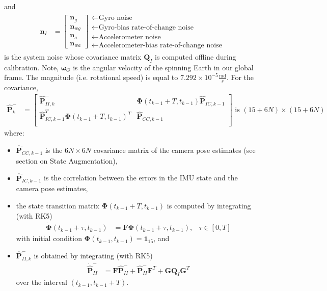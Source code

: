\documentclass[10pt,letterpaper,fleqn,oneside]{article}
\newcommand{\nl}{\\[0.5em]}
\def\Vec#1{\mathbf{#1}} %
\newcommand{\bbm}{\begin{bmatrix}}
\newcommand{\ebm}{\end{bmatrix}}
\begin{document}
and
\begin{align}
\Vec{n}_I &= \bbm \Vec{n}_g \nl \Vec{n}_{wg} \nl \Vec{n}_a \nl \Vec{n}_{wa} \ebm
					\begin{array}{l}
					\leftarrow \text{Gyro noise} \nl
					\leftarrow \text{Gyro-bias rate-of-change noise} \nl
					\leftarrow \text{Accelerometer noise} \nl
					\leftarrow \text{Accelerometer-bias rate-of-change noise}
					\end{array}		
\end{align}
is the system noise whose covariance matrix $\Vec{Q}_I$ is computed offline during calibration. Note, $\pmb{\omega}_G$ is the angular velocity of the spinning Earth in our global frame. The magnitude (i.e. rotational speed) is equal to $7.292 \times 10^{−5} \frac{\text{rad}}{s}$. 
\newpage\noindent
For the covariance,
\begin{align}
\hat{\Vec{P}}^-_k &= \bbm	\hat{\Vec{P}}^-_{II, k} & \boldsymbol{\Phi}\left(t_{k-1} + T, t_{k-1}\right)\hat{\Vec{P}}_{IC, k-1}\nl
											\hat{\Vec{P}}_{IC, k-1}^T \boldsymbol{\Phi}\left(t_{k-1} + T, t_{k-1}\right)^T & \hat{\Vec{P}}_{CC, k-1}\nl
								\ebm \text{ is }\left(15 + 6N\right)\times\left(15 + 6N\right)
\end{align}
where:
\begin{itemize}
\item $\hat{\Vec{P}}_{CC, k-1}$ is the $6N\times6N$ covariance matrix of the camera pose estimates (see section on State Augmentation), 
\item $\hat{\Vec{P}}_{IC, k-1}$ is the correlation between the errors in the IMU state and the camera pose estimates,
\item the state transition matrix $\boldsymbol{\Phi}\left(t_{k-1} + T, t_{k-1}\right)$ is computed by integrating (with RK5)
\begin{align}
\dot{\boldsymbol{\Phi}}\left(t_{k-1} + \tau, t_{k-1}\right) &= \Vec{F}\boldsymbol{\Phi}\left(t_{k-1} + \tau, t_{k-1}\right), &\tau\in\left[0,T\right]
\end{align}
with initial condition $\boldsymbol{\Phi}\left(t_{k-1}, t_{k-1}\right) = \Vec{1}_{15}$, and
\item $\hat{\Vec{P}}^-_{II, k}$ is obtained by integrating (with RK5)
\begin{align}
\dot{\hat{\Vec{P}}}^-_{II} &= \Vec{F}\hat{\Vec{P}}^-_{II} + \hat{\Vec{P}}^-_{II}\Vec{F}^T + \Vec{G}\Vec{Q}_I\Vec{G}^T
\end{align}
over the interval $\left(t_{k-1}, t_{k-1}+T\right)$.
\end{itemize}
\end{document}
